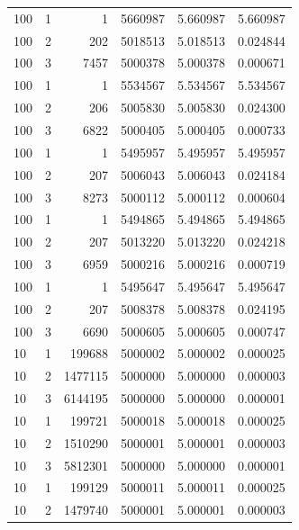 \documentclass[a4paper,oneside]{book}
\begin{document}
\begin{longtable}[c]{|l|l|r|l|l|l|}
    100      & 1         & 1         & 5660987 & 5.660987   & 5.660987 \\
    100      & 2         & 202       & 5018513 & 5.018513   & 0.024844 \\
    100      & 3         & 7457      & 5000378 & 5.000378   & 0.000671 \\
    100      & 1         & 1         & 5534567 & 5.534567   & 5.534567 \\
    100      & 2         & 206       & 5005830 & 5.005830   & 0.024300 \\
    100      & 3         & 6822      & 5000405 & 5.000405   & 0.000733 \\
    100      & 1         & 1         & 5495957 & 5.495957   & 5.495957 \\
    100      & 2         & 207       & 5006043 & 5.006043   & 0.024184 \\
    100      & 3         & 8273      & 5000112 & 5.000112   & 0.000604 \\
    100      & 1         & 1         & 5494865 & 5.494865   & 5.494865 \\
    100      & 2         & 207       & 5013220 & 5.013220   & 0.024218 \\
    100      & 3         & 6959      & 5000216 & 5.000216   & 0.000719 \\
    100      & 1         & 1         & 5495647 & 5.495647   & 5.495647 \\
    100      & 2         & 207       & 5008378 & 5.008378   & 0.024195 \\
    100      & 3         & 6690      & 5000605 & 5.000605   & 0.000747 \\
    10       & 1         & 199688    & 5000002 & 5.000002   & 0.000025 \\
    10       & 2         & 1477115   & 5000000 & 5.000000   & 0.000003 \\
    10       & 3         & 6144195   & 5000000 & 5.000000   & 0.000001 \\
    10       & 1         & 199721    & 5000018 & 5.000018   & 0.000025 \\
    10       & 2         & 1510290   & 5000001 & 5.000001   & 0.000003 \\
    10       & 3         & 5812301   & 5000000 & 5.000000   & 0.000001 \\
    10       & 1         & 199129    & 5000011 & 5.000011   & 0.000025 \\
    10       & 2         & 1479740   & 5000001 & 5.000001   & 0.000003 \\

\end{longtable}
\end{document}
